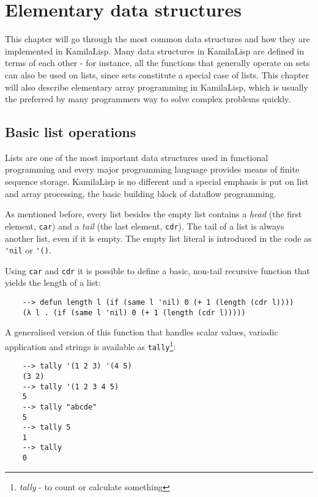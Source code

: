 
\chapter{Elementary data structures}

This chapter will go through the most common data structures and how they are implemented in KamilaLisp. Many data structures in KamilaLisp are defined in terms of each other - for instance, all the functions that generally operate on sets can also be used on lists, since sets constitute a special case of lists. This chapter will also describe elementary array programming in KamilaLisp, which is usually the preferred by many programmers way to solve complex problems quickly.

\section{Basic list operations}

Lists are one of the most important data structures used in functional programming and every major programming language provides means of finite sequence storage. KamilaLisp is no different and a special emphasis is put on list and array processing, the basic building block of dataflow programming.

As mentioned before, every list besides the empty list contains a \textit{head} (the first element, \verb|car|) and a \textit{tail} (the last element, \verb|cdr|). The tail of a list is always another list, even if it is empty. The empty list literal is introduced in the code as \verb|'nil| or \verb|'()|. 

Using \verb|car| and \verb|cdr| it is possible to define a basic, non-tail recursive function that yields the length of a list:

\begin{Verbatim}
    --> defun length l (if (same l 'nil) 0 (+ 1 (length (cdr l))))
    (λ l . (if (same l 'nil) 0 (+ 1 (length (cdr l)))))
\end{Verbatim}

A generalised version of this function that handles scalar values, variadic application and strings is available as \verb|tally|\footnote{\textit{tally} - to count or calculate something}:

\begin{Verbatim}
    --> tally '(1 2 3) '(4 5)
    (3 2)
    --> tally '(1 2 3 4 5)
    5
    --> tally "abcde"
    5
    --> tally 5
    1
    --> tally
    0
\end{Verbatim}

